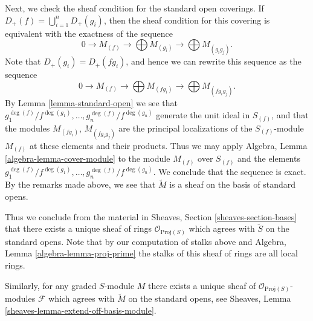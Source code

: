 \medskip\noindent
Next, we check the sheaf condition for the standard open coverings.
If $D_{+}(f) = \bigcup_{i = 1}^n D_{+}(g_i)$, then the sheaf condition
for this covering is equivalent with the exactness of the
sequence
$$
0 \to M_{(f)} \to \bigoplus M_{(g_i)} \to \bigoplus M_{(g_ig_j)}.
$$
Note that $D_{+}(g_i) = D_{+}(fg_i)$, and hence we can rewrite this
sequence as the sequence
$$
0 \to M_{(f)} \to \bigoplus M_{(fg_i)} \to \bigoplus M_{(fg_ig_j)}.
$$
By Lemma \ref{lemma-standard-open} we see that
$g_1^{\deg(f)}/f^{\deg(g_1)}, \ldots, g_n^{\deg(f)}/f^{\deg(g_n)}$
generate the unit ideal in $S_{(f)}$, and that the modules
$M_{(fg_i)}$, $M_{(fg_ig_j)}$ are the principal localizations
of the $S_{(f)}$-module $M_{(f)}$ at these elements and their products.
Thus we may apply Algebra, Lemma \ref{algebra-lemma-cover-module}
to the module $M_{(f)}$ over $S_{(f)}$ and the elements
$g_1^{\deg(f)}/f^{\deg(g_1)}, \ldots, g_n^{\deg(f)}/f^{\deg(g_n)}$.
We conclude that the sequence is exact. By the remarks
made above, we see that $\widetilde M$ is a sheaf
on the basis of standard opens.

\medskip\noindent
Thus we conclude from the material in
Sheaves, Section \ref{sheaves-section-bases}
that there exists a
unique sheaf of rings $\mathcal{O}_{\text{Proj}(S)}$
which agrees with $\widetilde S$ on the standard opens.
Note that by our computation of stalks above and
Algebra, Lemma \ref{algebra-lemma-proj-prime} the
stalks of this sheaf of rings are all local rings.

\medskip\noindent
Similarly, for any graded $S$-module $M$ there exists
a unique sheaf of $\mathcal{O}_{\text{Proj}(S)}$-modules
$\mathcal{F}$ which agrees with $\widetilde M$ on the
standard opens, see
Sheaves, Lemma \ref{sheaves-lemma-extend-off-basis-module}.

